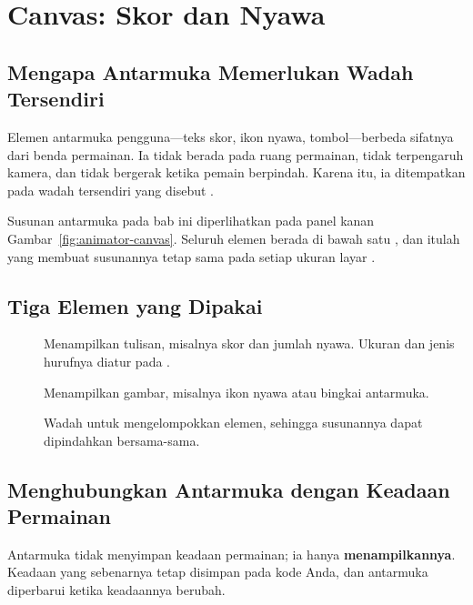 \section{Canvas: Skor dan Nyawa}
\label{sec:canvas-ui}

\subsection{Mengapa Antarmuka Memerlukan Wadah Tersendiri}

Elemen antarmuka pengguna---teks skor, ikon nyawa, tombol---berbeda sifatnya
dari benda permainan. Ia tidak berada pada ruang permainan, tidak terpengaruh
kamera, dan tidak bergerak ketika pemain berpindah. Karena itu, ia ditempatkan
pada wadah tersendiri yang disebut .

Susunan antarmuka pada bab ini diperlihatkan pada panel kanan
Gambar~\ref{fig:animator-canvas}. Seluruh elemen berada di
bawah satu , dan itulah yang membuat susunannya tetap sama
pada setiap ukuran layar \cite{unity-leveldesign}.

\subsection{Tiga Elemen yang Dipakai}

\begin{description}
  \item[] Menampilkan tulisan, misalnya skor dan jumlah nyawa.
        Ukuran dan jenis hurufnya diatur pada .
  \item[] Menampilkan gambar, misalnya ikon nyawa atau bingkai
        antarmuka.
  \item[] Wadah untuk mengelompokkan elemen, sehingga
        susunannya dapat dipindahkan bersama-sama.
\end{description}

\subsection{Menghubungkan Antarmuka dengan Keadaan Permainan}

Antarmuka tidak menyimpan keadaan permainan; ia hanya \textbf{menampilkannya}.
Keadaan yang sebenarnya tetap disimpan pada kode Anda, dan antarmuka
diperbarui ketika keadaannya berubah.


